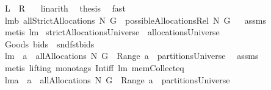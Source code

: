 \begin{isabellebody}
\ {\isachardoublequoteopen}{\isacharquery}L\ {\isacharminus}\ {\isacharquery}R\ {\isachargreater}{\isacharequal}{}{\isachardoublequoteclose}\ \isamarkupfalse%
\ linarith\ \isamarkupfalse%
\ {\isacharquery}thesis\ \isamarkupfalse%
\ fast\isanewline
{}\isamarkupfalse%
%
\endisatagproof
{\isafoldproof}%
%
\isadelimproof
\isanewline
%
\endisadelimproof
\isanewline
{}\isamarkupfalse%
\ lm{}{}b{\isacharcolon}\ {\isachardoublequoteopen}allStrictAllocations{\isacharprime}\ N\ G\ {\isacharequal}\ possibleAllocationsRel\ N\ G{\isachardoublequoteclose}%
\isadelimproof
\ %
\endisadelimproof
%
\isatagproof
{}\isamarkupfalse%
\ assms\ \isamarkupfalse%
\ {\isacharparenleft}metis\ lm{}{}{\isacharparenright}%
\endisatagproof
{\isafoldproof}%
%
\isadelimproof
%
\endisadelimproof
\isanewline
{}\isamarkupfalse%
\ {\isachardoublequoteopen}strictAllocationsUniverse\ {\isacharequal}{\isacharequal}\ allocationsUniverse{\isachardoublequoteclose}\isanewline
\isanewline
{}\isamarkupfalse%
\ {\isachardoublequoteopen}Goods\ bids\ {\isacharequal}{\isacharequal}\ {\isasymUnion}{\isacharparenleft}{\isacharparenleft}snd{\isasymcirc}fst{\isacharparenright}{\isacharbackquote}bids{\isacharparenright}{\isachardoublequoteclose}\isanewline
\isanewline
{}\isamarkupfalse%
\ lm{}{}{\isacharcolon}\ \ {\isachardoublequoteopen}a\ {\isasymin}\ allAllocations{\isacharprime}{\isacharprime}{\isacharprime}{\isacharprime}\ N\ G{\isachardoublequoteclose}\ \ {\isachardoublequoteopen}Range\ a\ {\isasymin}\ partitionsUniverse{\isachardoublequoteclose}\ \isanewline
%
\isadelimproof
%
\endisadelimproof
%
\isatagproof
{}\isamarkupfalse%
\ assms\ \isamarkupfalse%
\ {\isacharparenleft}metis\ {\isacharparenleft}lifting{\isacharcomma}\ mono{\isacharunderscore}tags{\isacharparenright}\ Int{\isacharunderscore}iff\ lm{}{}\ mem{\isacharunderscore}Collect{\isacharunderscore}eq{\isacharparenright}%
\endisatagproof
{\isafoldproof}%
%
\isadelimproof
\isanewline
%
\endisadelimproof
\isanewline
{}\isamarkupfalse%
\ lm{}{}a{\isacharcolon}\ \ {\isachardoublequoteopen}a\ {\isasymin}\ allAllocations{\isacharprime}\ N\ G{\isachardoublequoteclose}\ \ {\isachardoublequoteopen}Range\ a\ {\isasymin}\ partitionsUniverse{\isachardoublequoteclose}\isanewline

\end{isabellebody}
